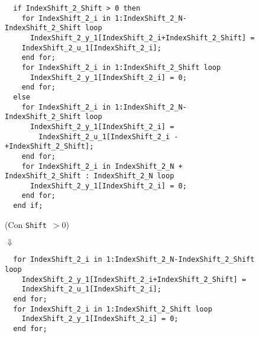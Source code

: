\begin{itemize}
\begin{figure}[htp]
\centering
\begin{verbatim}
  if IndexShift_2_Shift > 0 then
    for IndexShift_2_i in 1:IndexShift_2_N-IndexShift_2_Shift loop
      IndexShift_2_y_1[IndexShift_2_i+IndexShift_2_Shift] = 
	IndexShift_2_u_1[IndexShift_2_i];
    end for;
    for IndexShift_2_i in 1:IndexShift_2_Shift loop
      IndexShift_2_y_1[IndexShift_2_i] = 0;
    end for;
  else
    for IndexShift_2_i in 1:IndexShift_2_N-IndexShift_2_Shift loop
      IndexShift_2_y_1[IndexShift_2_i] = 
		IndexShift_2_u_1[IndexShift_2_i - +IndexShift_2_Shift];
    end for;
    for IndexShift_2_i in IndexShift_2_N + IndexShift_2_Shift : IndexShift_2_N loop
      IndexShift_2_y_1[IndexShift_2_i] = 0;
    end for;
  end if;
\end{verbatim}

(Con \texttt{Shift $> 0$})

$\Downarrow$

\begin{verbatim}
  for IndexShift_2_i in 1:IndexShift_2_N-IndexShift_2_Shift loop
    IndexShift_2_y_1[IndexShift_2_i+IndexShift_2_Shift] = 
	IndexShift_2_u_1[IndexShift_2_i];
  end for;
  for IndexShift_2_i in 1:IndexShift_2_Shift loop
    IndexShift_2_y_1[IndexShift_2_i] = 0;
  end for;
\end{verbatim}
\end{figure}
	  \end{itemize}
